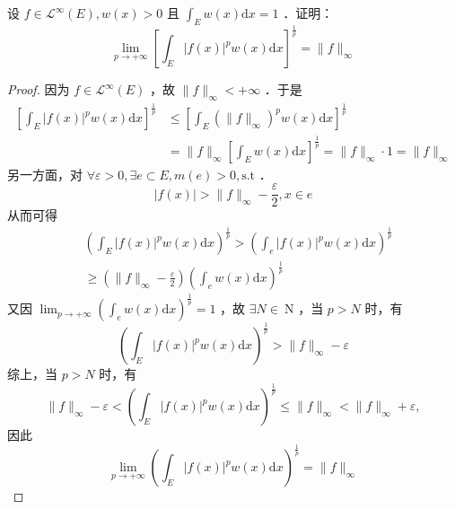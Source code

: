 \begin{exercise}[有关 $L^{\infty}$]
设 $f \in \mathscr{L}^{\infty}(E), w(x)>0$ 且 $\int_E w(x) \mathrm{d} x=1$ ．证明：
\[
\lim _{p \rightarrow+\infty}\left[\int_E|f(x)|^p w(x) \mathrm{d} x\right]^{\frac{1}{p}}=\|f\|_{\infty}
\]
\end{exercise}
\begin{proof}
因为 $f \in \mathscr{L}^{\infty}(E)$ ，故 $\|f\|_{\infty}<+\infty$ ．于是
\[
\begin{aligned}
{\left[\int_E|f(x)|^p w(x) \mathrm{d} x\right]^{\frac{1}{p}} } & \leqslant\left[\int_E\left(\|f\|_{\infty}\right)^p w(x) \mathrm{d} x\right]^{\frac{1}{p}} \\
& =\|f\|_{\infty}\left[\int_E w(x) \mathrm{d} x\right]^{\frac{1}{p}}=\|f\|_{\infty} \cdot 1=\|f\|_{\infty}
\end{aligned}
\]
另一方面，对 $\forall \varepsilon>0, \exists e \subset E, m(e)>0, \mathrm{s.t}$ ．
\[
|f(x)|>\|f\|_{\infty}-\frac{\varepsilon}{2}, x \in e
\]
从而可得
\[
\begin{aligned}
& \left(\int_E|f(x)|^p w(x) \mathrm{d} x\right)^{\frac{1}{p}}>\left(\int_e|f(x)|^p w(x) \mathrm{d} x\right)^{\frac{1}{p}} \\
& \geqslant\left(\|f\|_{\infty}-\frac{\varepsilon}{2}\right)\left(\int_e w(x) \mathrm{d} x\right)^{\frac{1}{p}}
\end{aligned}
\]
又因 $\lim _{p \rightarrow+\infty}\left(\int_e w(x) \mathrm{d} x\right)^{\frac{1}{p}}=1$ ，故 $\exists N \in \mathrm{~N}$ ，当 $p>N$ 时，有
\[
\left(\int_E|f(x)|^p w(x) \mathrm{d} x\right)^{\frac{1}{p}}>\|f\|_{\infty}-\varepsilon
\]
综上，当 $p>N$ 时，有
\[
\|f\|_{\infty}-\varepsilon<\left(\int_E|f(x)|^p w(x) \mathrm{d} x\right)^{\frac{1}{p}} \leqslant\|f\|_{\infty}<\|f\|_{\infty}+\varepsilon,
\]
因此
\[
\lim _{p \rightarrow+\infty}\left(\int_E|f(x)|^p w(x) \mathrm{d} x\right)^{\frac{1}{p}}=\|f\|_{\infty}
\]
\end{proof}

